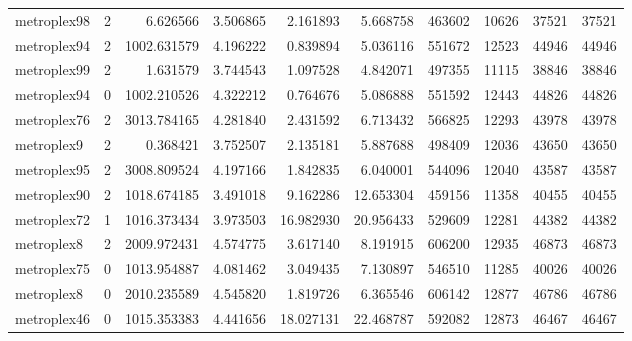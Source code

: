 \documentclass[../../../thesis.tex]{subfiles}
\begin{document}
\begin{longtable}{|l|r|r|r|r|r|r|r|r|r|}
metroplex98 & 2 & 6.626566 & 3.506865 & 2.161893 & 5.668758 & 463602 & 10626 & 37521 & 37521 \\
metroplex94 & 2 & 1002.631579 & 4.196222 & 0.839894 & 5.036116 & 551672 & 12523 & 44946 & 44946 \\
metroplex99 & 2 & 1.631579 & 3.744543 & 1.097528 & 4.842071 & 497355 & 11115 & 38846 & 38846 \\
metroplex94 & 0 & 1002.210526 & 4.322212 & 0.764676 & 5.086888 & 551592 & 12443 & 44826 & 44826 \\
metroplex76 & 2 & 3013.784165 & 4.281840 & 2.431592 & 6.713432 & 566825 & 12293 & 43978 & 43978 \\
metroplex9 & 2 & 0.368421 & 3.752507 & 2.135181 & 5.887688 & 498409 & 12036 & 43650 & 43650 \\
metroplex95 & 2 & 3008.809524 & 4.197166 & 1.842835 & 6.040001 & 544096 & 12040 & 43587 & 43587 \\
metroplex90 & 2 & 1018.674185 & 3.491018 & 9.162286 & 12.653304 & 459156 & 11358 & 40455 & 40455 \\
metroplex72 & 1 & 1016.373434 & 3.973503 & 16.982930 & 20.956433 & 529609 & 12281 & 44382 & 44382 \\
metroplex8 & 2 & 2009.972431 & 4.574775 & 3.617140 & 8.191915 & 606200 & 12935 & 46873 & 46873 \\
metroplex75 & 0 & 1013.954887 & 4.081462 & 3.049435 & 7.130897 & 546510 & 11285 & 40026 & 40026 \\
metroplex8 & 0 & 2010.235589 & 4.545820 & 1.819726 & 6.365546 & 606142 & 12877 & 46786 & 46786 \\
metroplex46 & 0 & 1015.353383 & 4.441656 & 18.027131 & 22.468787 & 592082 & 12873 & 46467 & 46467 \\
\end{longtable}
\end{document}
